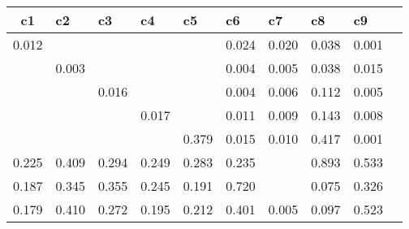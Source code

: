 \begin{table}[htbp]
\begin{tabular}{|l|l|l|l|l|l|l|l|l|l|}\hline  
 \multicolumn{1}{c}{ c1 }  & c2  & c3  & c4  & c5  & c6  & c7  & c8  & c9  \\ \hline  
    0.012 &  &  &  &  &     0.024 &     0.020 &     0.038 &     0.001 \\ \hline 
 &     0.003 &  &  &  &     0.004 &     0.005 &     0.038 &     0.015 \\ \hline 
 &  &     0.016 &  &  &     0.004 &     0.006 &     0.112 &     0.005 \\ \hline 
 &  &  &     0.017 &  &     0.011 &     0.009 &     0.143 &     0.008 \\ \hline 
 &  &  &  &     0.379 &     0.015 &     0.010 &     0.417 &     0.001 \\ \hline 
    0.225 &     0.409 &     0.294 &     0.249 &     0.283 &     0.235 &  &     0.893 &     0.533 \\ \hline 
    0.187 &     0.345 &     0.355 &     0.245 &     0.191 &     0.720 &  &     0.075 &     0.326 \\ \hline 
    0.179 &     0.410 &     0.272 &     0.195 &     0.212 &     0.401 &     0.005 &     0.097 &     0.523 \\ \hline 
  \end{tabular}
\end{table}
